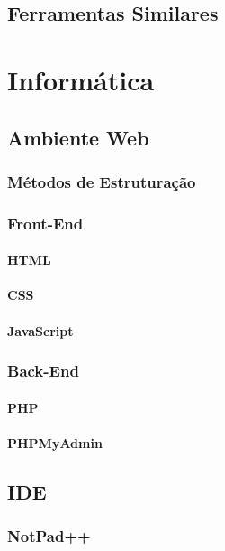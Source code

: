 \documentclass[12pt,a4paper]{book}
\begin{document}
\section{Ferramentas Similares}



\chapter{Informática}

\section{Ambiente Web}
\subsection{Métodos de Estruturação}

\subsection{Front-End}
\subsubsection{HTML}

\subsubsection{CSS}

\subsubsection{JavaScript}

\subsection{Back-End}
\subsubsection{PHP}

\subsubsection{PHPMyAdmin}

\section{IDE}
\subsection{NotPad++}
\end{document}
